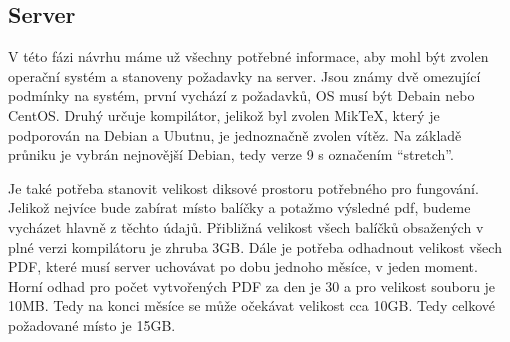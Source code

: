 \subsection{Server}
V této fázi návrhu máme už všechny potřebné informace, aby mohl být zvolen operační systém a stanoveny požadavky na server. Jsou známy dvě omezující podmínky na systém, první vychází z požadavků, OS musí být Debain nebo CentOS. Druhý určuje kompilátor, jelikož byl zvolen MikTeX, který je podporován na Debian a Ubutnu, je jednoznačně zvolen vítěz. Na základě průniku je vybrán nejnovější Debian, tedy verze 9 s označením \enquote{stretch}. 
\par
Je také potřeba stanovit velikost diksové prostoru potřebného pro fungování. Jelikož nejvíce bude zabírat místo balíčky a potažmo výsledné pdf, budeme vycházet hlavně z těchto údajů. Přibližná velikost všech balíčků obsažených v plné verzi kompilátoru je zhruba 3GB. Dále je potřeba odhadnout velikost všech PDF, které musí server uchovávat po dobu jednoho měsíce, v jeden moment. Horní odhad pro počet vytvořených PDF za den je 30 a pro velikost souboru je 10MB. Tedy na konci měsíce se může očekávat velikost cca 10GB. Tedy celkové požadované místo je 15GB.  
 



